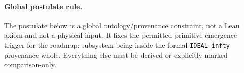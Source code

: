 \paragraph{Global postulate rule.} The postulate below is a global ontology/provenance constraint, not a Lean axiom and not a physical input. It fixes the permitted primitive emergence trigger for the roadmap: subsystem-being inside the formal \texttt{IDEAL\_infty} provenance whole. Everything else must be derived or explicitly marked comparison-only.

